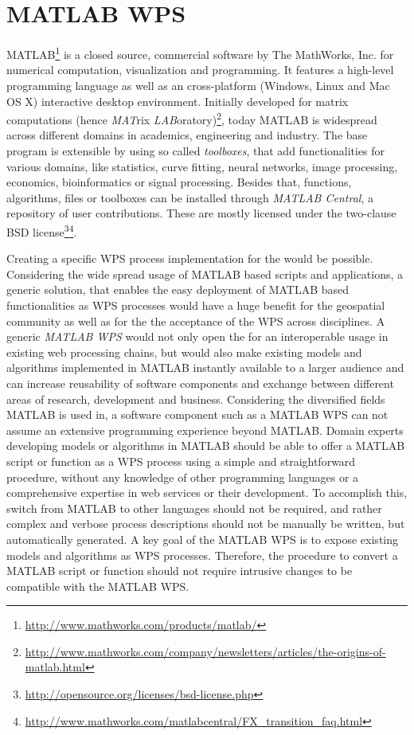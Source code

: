 \chapter{MATLAB WPS}
  MATLAB\footnote{\url{http://www.mathworks.com/products/matlab/}} is a closed source, commercial software by The MathWorks, Inc. for numerical computation, visualization and programming. It features a high-level programming language as well as an cross-platform (Windows, Linux and Mac OS X) interactive desktop environment. Initially developed for matrix computations (hence \emph{MAT}rix \emph{LAB}oratory)\footnote{\url{http://www.mathworks.com/company/newsletters/articles/the-origins-of-matlab.html}}, today MATLAB is widespread across different domains in academics, engineering and industry. The base program is extensible by using so called \emph{toolboxes}, that add functionalities for various domains, like statistics, curve fitting, neural networks, image processing, economics, bioinformatics or signal processing. Besides that, functions, algorithms, files or toolboxes can be installed through \emph{MATLAB Central}, a repository of user contributions. These are mostly licensed under the two-clause BSD license\footnote{\url{http://opensource.org/licenses/bsd-license.php}}\footnote{\url{http://www.mathworks.com/matlabcentral/FX_transition_faq.html}}.

  Creating a specific \ac{WPS} process implementation for the \la would be possible. Considering the wide spread usage of MATLAB based scripts and applications, a generic solution, that enables the easy deployment of MATLAB based functionalities as \ac{WPS} processes would have a huge benefit for the geospatial community as well as for the the acceptance of the \ac{WPS} across disciplines. A generic \emph{MATLAB WPS} would not only open the \la for an interoperable usage in existing web processing chains, but would also make existing models and algorithms implemented in MATLAB instantly available to a larger audience and can increase reusability of software components and exchange between different areas of research, development and business. Considering the diversified fields MATLAB is used in, a software component such as a MATLAB WPS can not assume an extensive programming experience beyond MATLAB. Domain experts developing models or algorithms in MATLAB should be able to offer a MATLAB script or function as a \ac{WPS} process using a simple and straightforward procedure, without any knowledge of other programming languages or a comprehensive expertise in web services or their development. To accomplish this, switch from MATLAB to other languages should not be required, and rather complex and verbose process descriptions should not be manually be written, but automatically generated. A key goal of the MATLAB WPS is to expose existing models and algorithms as \ac{WPS} processes. Therefore, the procedure to convert a MATLAB script or function should not require intrusive changes to be compatible with the MATLAB WPS.

